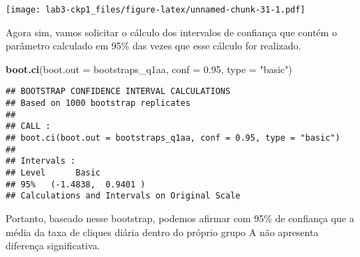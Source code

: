 \documentclass[]{article}
\newenvironment{Shaded}{\begin{snugshade}}{\end{snugshade}}
\newcommand{\KeywordTok}[1]{\textcolor[rgb]{0.13,0.29,0.53}{\textbf{#1}}}
\newcommand{\DataTypeTok}[1]{\textcolor[rgb]{0.13,0.29,0.53}{#1}}
\newcommand{\FloatTok}[1]{\textcolor[rgb]{0.00,0.00,0.81}{#1}}
\newcommand{\StringTok}[1]{\textcolor[rgb]{0.31,0.60,0.02}{#1}}
\newcommand{\NormalTok}[1]{#1}
\begin{document}
\texttt{[image: lab3-ckp1\_files/figure-latex/unnamed-chunk-31-1.pdf]}

Agora sim, vamos solicitar o cálculo dos intervalos de confiança que
contém o parâmetro calculado em 95\% das vezes que esse cálculo for
realizado.

\begin{Shaded}
\begin{Highlighting}[]
\KeywordTok{boot.ci}\NormalTok{(}\DataTypeTok{boot.out =}\NormalTok{ bootstraps_q1aa, }\DataTypeTok{conf =} \FloatTok{0.95}\NormalTok{, }\DataTypeTok{type =} \StringTok{"basic"}\NormalTok{)}
\end{Highlighting}
\end{Shaded}

\begin{verbatim}
## BOOTSTRAP CONFIDENCE INTERVAL CALCULATIONS
## Based on 1000 bootstrap replicates
## 
## CALL : 
## boot.ci(boot.out = bootstraps_q1aa, conf = 0.95, type = "basic")
## 
## Intervals : 
## Level      Basic         
## 95%   (-1.4838,  0.9401 )  
## Calculations and Intervals on Original Scale
\end{verbatim}

Portanto, baseado nesse bootstrap, podemos afirmar com 95\% de confiança
que a média da taxa de cliques diária dentro do próprio grupo A não
apresenta diferença significativa.
\end{document}
